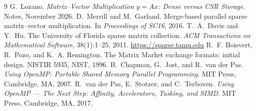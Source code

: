 \documentclass[11pt,a4paper]{article}
\begin{document}
\begin{thebibliography}{9}
 G.~Lozano. \emph{Matrix--Vector Multiplication $y=Ax$: Dense versus CSR
  Storage}. Notes, November 2026.
 D.~Merrill and M.~Garland. Merge-based parallel sparse matrix--vector
  multiplication. In \emph{Proceedings of SC16}, 2016.
 T.~A.~Davis and Y.~Hu. The University of Florida sparse matrix
  collection. \emph{ACM Transactions on Mathematical Software}, 38(1):1--25, 2011.
  \url{https://sparse.tamu.edu}
 R.~F. Boisvert, R.~Pozo, and K.~A. Remington. The Matrix Market exchange
  formats: initial design. NISTIR 5935, NIST, 1996.
 B.~Chapman, G.~Jost, and R.~van der Pas. \emph{Using OpenMP: Portable
  Shared Memory Parallel Programming}. MIT Press, Cambridge, MA, 2007.
 R.~van der Pas, E.~Stotzer, and C.~Terboven. \emph{Using OpenMP --- The Next
  Step: Affinity, Accelerators, Tasking, and SIMD}. MIT Press, Cambridge, MA, 2017.
\end{thebibliography}
\end{document}
